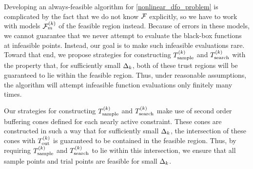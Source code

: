 Developing an always-feasible algorithm for \cref{nonlinear_dfo_problem}  is complicated by the fact that we do not know ${\mathcal F}$ explicitly,
so we have to work with models ${\mathcal F_m^{(k)}}$ of the feasible region instead.
Because of errors in these models,  we cannot guarantee that we never attempt to evaluate the black-box functions at infeasible points.
Instead, our goal is to make such infeasible evaluations rare.
Toward that end,  we propose strategies for constructing ${T_{\text{sample}}^{(k)}}$ and ${T_{\text{search}}^{(k)}}$ with the property that,  for sufficiently small $\Delta_k$,  both of these trust regions will be guaranteed to lie within  the feasible region.
Thus,  under reasonable assumptions, the algorithm will attempt infeasible function evaluations only finitely many times.




%

%


Our strategies for constructing ${T_{\text{sample}}^{(k)}}$ and ${T_{\text{search}}^{(k)}}$ make use of second order buffering cones defined for each nearly active constraint.
These cones are constructed in such a way that for sufficiently small $\Delta_k$, the intersection of these cones with ${T_{\text{out}}^{(k)}}$ is guaranteed to be contained in the feasible region.
Thus, by requiring ${T_{\text{sample}}^{(k)}}$ and ${T_{\text{search}}^{(k)}}$ to lie within this intersection, we ensure that all sample points and trial points are feasible for small $\Delta_k$.

